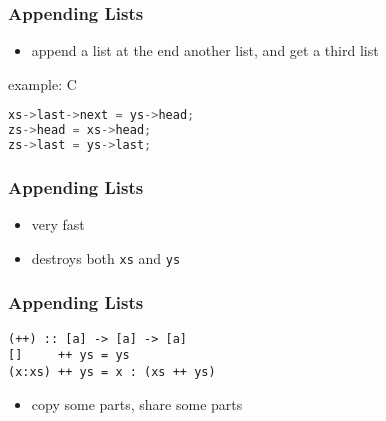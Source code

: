 \documentclass[dvipsnames]{beamer}
\theoremstyle{plain}
\begin{document}
\begin{frame}[fragile]
  \frametitle{Appending Lists}

  \begin{itemize}
    \item append a list at the end another list, and get a third list
  \end{itemize}

  \begin{center}
  \end{center}

  \begin{exampleblock}{example: C}
    \begin{lstlisting}[language=C]
xs->last->next = ys->head;
zs->head = xs->head;
zs->last = ys->last;
    \end{lstlisting}
  \end{exampleblock}
\end{frame}

\begin{frame}
  \frametitle{Appending Lists}

  \begin{center}
  \end{center}

  \begin{itemize}
    \item very fast
    \item destroys both \lstinline|xs| and \lstinline|ys|
  \end{itemize}
\end{frame}

\begin{frame}[fragile]
  \frametitle{Appending Lists}

  \begin{lstlisting}
(++) :: [a] -> [a] -> [a]
[]     ++ ys = ys
(x:xs) ++ ys = x : (xs ++ ys)
  \end{lstlisting}

  \begin{center}
  \end{center}

  \begin{itemize}
    \item copy some parts, share some parts
  \end{itemize}
\end{frame}
\end{document}
